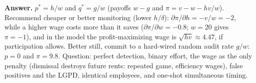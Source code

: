 \documentclass[11pt,a4paper]{article}
\newcommand{\answer}[1]{\begin{tcolorbox}[colback=ans!5,colframe=ans,boxrule=0.6pt,
  left=5pt,right=5pt,top=3pt,bottom=3pt]\textbf{Answer.} #1\end{tcolorbox}}
\begin{document}
\answer{$p^* = h/w$ and $q^* = g/w$ (payoffs $w - g$ and $\pi = v - w - hv/w$). Recommend cheaper or
better monitoring (lower $h/\delta$): $\partial\pi/\partial h = -v/w = -2$, while a higher wage costs
more than it saves ($\partial\pi/\partial w = -0.8$; $w = 20$ gives $\pi = -1$), and in the model the
profit-maximizing wage is $\sqrt{hv} \approx 4.47$, if participation allows. Better still, commit to
a hard-wired random audit rate $g/w$: $p = 0$ and $\pi = 9.8$. Question: perfect detection, binary
effort, the wage as the only penalty (dismissal destroys future rents: repeated game, efficiency
wages), false positives and the LGPD, identical employees, and one-shot simultaneous timing.}
\end{document}
